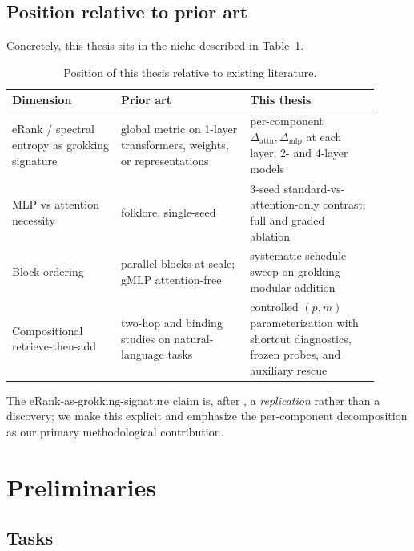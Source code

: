 \documentclass{article}
\begin{document}
\subsection{Position relative to prior art}

Concretely, this thesis sits in the niche described in Table~\ref{tab:position}.

\begin{table}[h]
    \centering
    \caption{Position of this thesis relative to existing literature.}
    \label{tab:position}
    \small
    \begin{tabular}{p{0.27\linewidth}p{0.32\linewidth}p{0.32\linewidth}}
        \toprule
        Dimension & Prior art & This thesis \\
        \midrule
        eRank / spectral entropy as grokking signature & global metric on 1-layer transformers, weights, or representations & per-component $\Delta_{\text{attn}}, \Delta_{\text{mlp}}$ at each layer; 2- and 4-layer models \\
        \addlinespace
        MLP vs attention necessity & folklore, single-seed & 3-seed standard-vs-attention-only contrast; full and graded ablation \\
        \addlinespace
        Block ordering & parallel blocks at scale; gMLP attention-free & systematic schedule sweep on grokking modular addition \\
        \addlinespace
        Compositional retrieve-then-add & two-hop and binding studies on natural-language tasks & controlled $(p,m)$ parameterization with shortcut diagnostics, frozen probes, and auxiliary rescue \\
        \bottomrule
    \end{tabular}
\end{table}

The eRank-as-grokking-signature claim is, after \citet{anonymous2026spectral}, a \emph{replication} rather than a discovery; we make this explicit and emphasize the per-component decomposition as our primary methodological contribution.

\section{Preliminaries}
\label{sec:prelim}

\subsection{Tasks}
\end{document}
